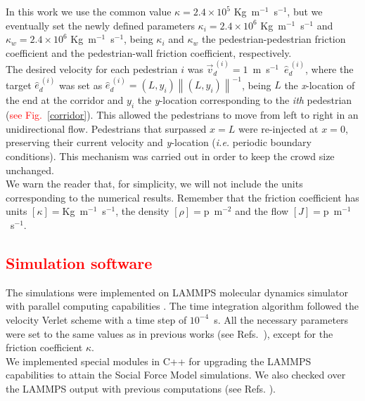 \documentclass[preprint,12pt]{elsarticle}
\begin{document}
In this work we use the common value $\kappa=2.4 \times 
10^{5}$ Kg~m$^{-1}$~s$^{-1}$, but we eventually set the newly defined 
parameters $\kappa_i=2.4 \times 10^{6}$ Kg~m$^{-1}$~s$^{-1}$  and $\kappa_w=2.4 
\times 10^{6}$ Kg~m$^{-1}$~s$^{-1}$, being $\kappa_i$ and $\kappa_w$ the 
pedestrian-pedestrian friction coefficient and the pedestrian-wall friction 
coefficient, respectively. \\

The desired velocity for each pedestrian $i$ was 
$\vec{v}_d^{~(i)}=1$~m~s$^{-1}$~$\hat{e}_d^{~(i)}$, where the target $\hat{e}_d^{~(i)}$ 
was set as $\hat{e}_d^{~(i)}=(L,y_i)\left \| (L,y_i) \right \|^{-1}$, being $L$ 
the \textit{x}-location of the end at the corridor and $y_i$ the 
\textit{y}-location corresponding to the \textit{ith} pedestrian 
(\textcolor{red}{see Fig.~\ref{corridor}}). This allowed the pedestrians to 
move from left to right in an unidirectional flow. Pedestrians that surpassed 
$x=L$ were re-injected at $x=0$, preserving their current velocity and 
\textit{y}-location (\textit{i.e.} periodic boundary conditions). This mechanism 
was carried out in order to keep
the crowd size unchanged.\\

We warn the reader that, for simplicity, we will not include the units 
corresponding to the numerical results. Remember that the friction coefficient 
has units $\left [ \kappa \right]=$Kg~m$^{-1}$~s$^{-1}$, the density $\left [ 
\rho \right]=$p~m$^{-2}$ and the flow $\left [ J \right 
]=$p~m$^{-1}$~s$^{-1}$.\\

\subsection{\label{software}\textcolor{red}{Simulation software}}

The simulations were implemented on LAMMPS molecular dynamics 
simulator with parallel computing capabilities \cite{plimpton}. The time 
integration algorithm followed the velocity Verlet scheme with a time step of 
$10^{-4}$~s. All the necessary parameters were set to the same values as in 
previous works (see Refs.~\cite{Dorso5,sticco}), except for the friction 
coefficient $\kappa$. \\

We implemented special modules in C++ for upgrading the LAMMPS 
capabilities to attain the Social Force Model simulations. We also checked over 
the LAMMPS output with previous computations (see Refs. \cite{Dorso1, 
Dorso2,Dorso3, Dorso4,Dorso6}).\\
\end{document}
